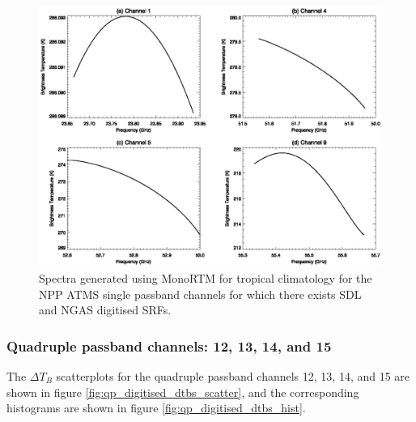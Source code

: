 \begin{figure}[htp]
  \centering
  \includegraphics[scale=1.0]{graphics/spectra/ch1_4_5_9.eps}
  \caption{Spectra generated using MonoRTM for tropical climatology for the NPP ATMS single passband channels for which there exists SDL and NGAS digitised SRFs.}
  \label{fig:ch1_4_5_9.spectra}
\end{figure}


\subsubsection{Quadruple passband channels: 12, 13, 14, and 15}
The $\Delta T_B$ scatterplots for the quadruple passband channels 12, 13, 14, and 15 are shown in figure \ref{fig:qp_digitised_dtbs_scatter}, and the corresponding histograms are shown in figure \ref{fig:qp_digitised_dtbs_hist}.

